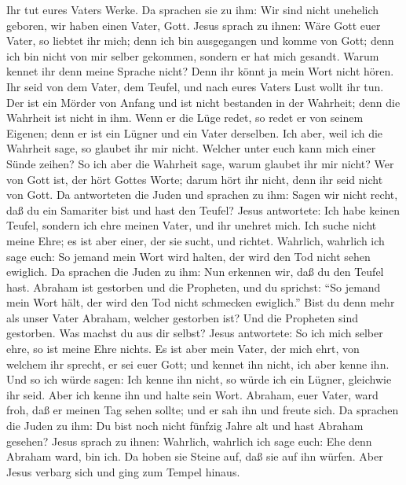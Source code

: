 Ihr tut eures Vaters Werke. Da sprachen sie zu ihm: Wir sind nicht
unehelich geboren, wir haben einen Vater, Gott.  Jesus
sprach zu ihnen: Wäre Gott euer Vater, so liebtet ihr mich; denn ich bin
ausgegangen und komme von Gott; denn ich bin nicht von mir selber
gekommen, sondern er hat mich gesandt.  Warum kennet ihr
denn meine Sprache nicht? Denn ihr könnt ja mein Wort nicht hören.
 Ihr seid von dem Vater, dem Teufel, und nach eures Vaters
Lust wollt ihr tun. Der ist ein Mörder von Anfang und ist nicht
bestanden in der Wahrheit; denn die Wahrheit ist nicht in ihm. Wenn er
die Lüge redet, so redet er von seinem Eigenen; denn er ist ein Lügner
und ein Vater derselben.  Ich aber, weil ich die Wahrheit
sage, so glaubet ihr mir nicht.  Welcher unter euch kann
mich einer Sünde zeihen? So ich aber die Wahrheit sage, warum glaubet
ihr mir nicht?  Wer von Gott ist, der hört Gottes Worte;
darum hört ihr nicht, denn ihr seid nicht von Gott.  Da
antworteten die Juden und sprachen zu ihm: Sagen wir nicht recht, daß du
ein Samariter bist und hast den Teufel?  Jesus antwortete:
Ich habe keinen Teufel, sondern ich ehre meinen Vater, und ihr unehret
mich.  Ich suche nicht meine Ehre; es ist aber einer, der
sie sucht, und richtet.  Wahrlich, wahrlich ich sage euch:
So jemand mein Wort wird halten, der wird den Tod nicht sehen ewiglich.
 Da sprachen die Juden zu ihm: Nun erkennen wir, daß du den
Teufel hast. Abraham ist gestorben und die Propheten, und du sprichst:
``So jemand mein Wort hält, der wird den Tod nicht schmecken ewiglich.''
 Bist du denn mehr als unser Vater Abraham, welcher
gestorben ist? Und die Propheten sind gestorben. Was machst du aus dir
selbst?  Jesus antwortete: So ich mich selber ehre, so ist
meine Ehre nichts. Es ist aber mein Vater, der mich ehrt, von welchem
ihr sprecht, er sei euer Gott;  und kennet ihn nicht, ich
aber kenne ihn. Und so ich würde sagen: Ich kenne ihn nicht, so würde
ich ein Lügner, gleichwie ihr seid. Aber ich kenne ihn und halte sein
Wort.  Abraham, euer Vater, ward froh, daß er meinen Tag
sehen sollte; und er sah ihn und freute sich.  Da sprachen
die Juden zu ihm: Du bist noch nicht fünfzig Jahre alt und hast Abraham
gesehen?  Jesus sprach zu ihnen: Wahrlich, wahrlich ich
sage euch: Ehe denn Abraham ward, bin ich.  Da hoben sie
Steine auf, daß sie auf ihn würfen. Aber Jesus verbarg sich und ging zum
Tempel hinaus.

